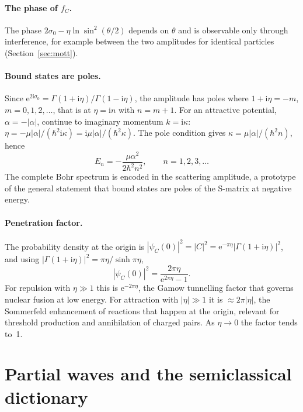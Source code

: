 \documentclass[11pt,a4paper]{book}
\numberwithin{equation}{chapter}
\newcommand{\ii}{\mathrm{i}}
\newcommand{\ee}{\mathrm{e}}
\begin{document}
\paragraph{The phase of $f_C$.} The phase $2\sigma_0-\eta\ln\sin^2(\theta/2)$
depends on $\theta$ and is observable only through interference, for example
between the two amplitudes for identical particles (Section~\ref{sec:mott}).

\paragraph{Bound states are poles.} Since
$\ee^{2\ii\sigma_0}=\Gamma(1+\ii\eta)/\Gamma(1-\ii\eta)$, the amplitude has
poles where $1+\ii\eta=-m$, $m=0,1,2,\dots$, that is at $\eta=\ii n$ with
$n=m+1$. For an attractive potential, $\alpha=-|\alpha|$, continue to imaginary
momentum $k=\ii\kappa$: $\eta=-\mu|\alpha|/(\hbar^2\ii\kappa)
=\ii\mu|\alpha|/(\hbar^2\kappa)$. The pole condition gives
$\kappa=\mu|\alpha|/(\hbar^2n)$, hence
\begin{equation}\label{eq:bohr}
  E_n=-\frac{\mu\alpha^2}{2\hbar^2n^2},\qquad n=1,2,3,\dots
\end{equation}
The complete Bohr spectrum is encoded in the scattering amplitude, a prototype
of the general statement that bound states are poles of the S-matrix at
negative energy.

\paragraph{Penetration factor.} The probability density at the origin is
$|\psi_C(0)|^2=|C|^2=\ee^{-\pi\eta}|\Gamma(1+\ii\eta)|^2$, and using
$|\Gamma(1+\ii\eta)|^2=\pi\eta/\sinh\pi\eta$,
\begin{equation}\label{eq:sommerfeld}
  |\psi_C(0)|^2=\frac{2\pi\eta}{\ee^{2\pi\eta}-1}.
\end{equation}
For repulsion with $\eta\gg1$ this is $\ee^{-2\pi\eta}$, the Gamow tunnelling
factor that governs nuclear fusion at low energy. For attraction with
$|\eta|\gg1$ it is $\approx2\pi|\eta|$, the Sommerfeld enhancement of reactions
that happen at the origin, relevant for threshold production and annihilation of
charged pairs. As $\eta\to0$ the factor tends to~1.

\section{Partial waves and the semiclassical dictionary}\label{sec:partial}
\end{document}
